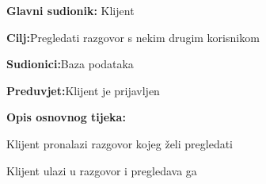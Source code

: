 						\noindent {}
						\begin{packed_item}
							
							\item \textbf{Glavni sudionik: }Klijent
							\item  \textbf{Cilj:}Pregledati razgovor s nekim drugim korisnikom
							\item  \textbf{Sudionici:}Baza podataka
							\item  \textbf{Preduvjet:}Klijent je prijavljen
							\item  \textbf{Opis osnovnog tijeka:}
							
							\item[] \begin{packed_enum}
								
								\item Klijent pronalazi razgovor kojeg želi pregledati 
								\item Klijent ulazi u razgovor i pregledava ga
				
							\end{packed_enum}
						\end{packed_item}
						
